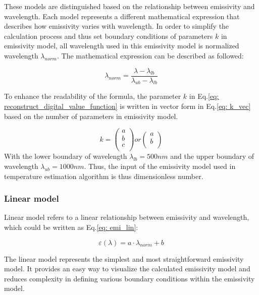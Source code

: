 These models are distinguished based on the relationship between 
emissivity and wavelength. Each model represents a different 
mathematical expression that describes how emissivity varies with 
wavelength. In order to simplify the calculation process and thus set 
boundary conditions of parameters $k$ in emissivity model, all wavelength 
used in this emissivity model is normalized wavelength $\lambda_{norm}$. The 
mathematical expression can be described as followed:

\begin{equation}
  \label{eq: wavelength_norm}
  \lambda_{norm} = \frac{\lambda - \lambda_{lb}}{\lambda_{ub} - \lambda_{lb}}
\end{equation}


To enhance the readability of the formula, the parameter $k$ in 
Eq.\ref{eq: reconstruct_digital_value_function} is written in vector 
form in Eq.\ref{eq: k_vec} based on the number of parameters in emissivity model.

\begin{equation}
  \label{eq: k_vec}
  k = \begin{pmatrix}
    a \\
    b \\
    c \\
    \end{pmatrix} 
    or 
    \begin{pmatrix}
      a \\
      b \\
      \end{pmatrix}
\end{equation}
With the lower boundary of wavelength $\lambda_{lb} = 500 {nm}$ and the 
upper boundary of wavelength $\lambda_{ub} = 1000 {nm}$. Thus, the input 
of the emissivity model used in temperature estimation algorithm is thus 
dimensionless number.

\subsubsection{Linear model}
Linear model refers to a linear relationship between emissivity and wavelength,
which could be written as Eq.\ref{eq: emi_lin}:

\begin{equation}
  \label{eq: emi_lin}
  \varepsilon(\lambda) = a\cdot \lambda_{norm} + b
\end{equation}

The linear model represents the simplest and most straightforward emissivity model. 
It provides an easy way to visualize the calculated emissivity model 
and reduces complexity in defining various boundary conditions within the 
emissivity model.

